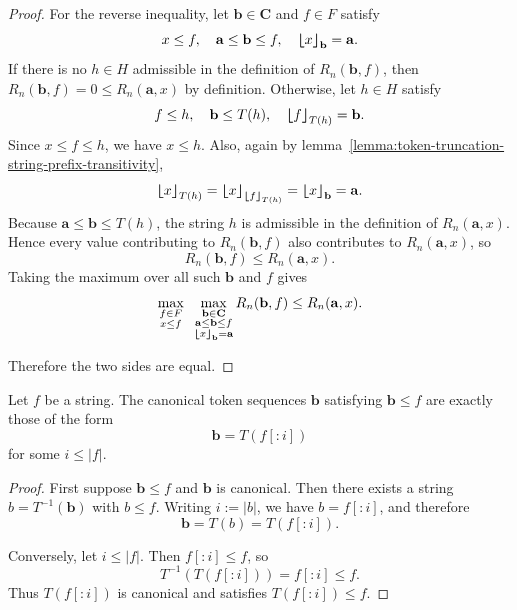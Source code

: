 \begin{proof}
    For the reverse inequality, let $\mathbf{b} \in \mathbf{C}$ and $f \in F$ satisfy
    $$
    x \leq f, \quad \mathbf{a} \leq \mathbf{b} \leq f, \quad {\bm{\lfloor}} x {\bm{\rfloor}}_{\mathbf{b}} = \mathbf{a}.
    $$
    If there is no $h \in H$ admissible in the definition of $R_n(\mathbf{b}, f)$, then
    $R_n(\mathbf{b}, f) = 0 \leq R_n(\mathbf{a}, x)$ by definition.
    Otherwise, let $h \in H$ satisfy
    $$
    f \leq h, \quad \mathbf{b} \leq T(h), \quad {\bm{\lfloor}} f {\bm{\rfloor}}_{T(h)} = \mathbf{b}.
    $$
    Since $x \leq f \leq h$, we have $x \leq h$. Also, again by
    lemma~\ref{lemma:token-truncation-string-prefix-transitivity},
    $$
    {\bm{\lfloor}} x {\bm{\rfloor}}_{T(h)}
    =
    {\bm{\lfloor}} x {\bm{\rfloor}}_{{\bm{\lfloor}} f {\bm{\rfloor}}_{T(h)}}
    =
    {\bm{\lfloor}} x {\bm{\rfloor}}_{\mathbf{b}}
    =
    \mathbf{a}.
    $$
    Because $\mathbf{a} \leq \mathbf{b} \leq T(h)$, the string $h$ is admissible in the
    definition of $R_n(\mathbf{a}, x)$. Hence every value contributing to $R_n(\mathbf{b}, f)$
    also contributes to $R_n(\mathbf{a}, x)$, so
    $$
    R_n(\mathbf{b}, f) \leq R_n(\mathbf{a}, x).
    $$
    Taking the maximum over all such $\mathbf{b}$ and $f$ gives
    $$
    \max_{\substack{
        f \in F \\
        x \leq f
    }}
    \;\;
    \max_{\substack{
        \mathbf{b} \in \mathbf{C} \\
        \mathbf{a} \leq \mathbf{b} \leq f \\
        {\bm{\lfloor}} x {\bm{\rfloor}}_{\mathbf{b}} = \mathbf{a}
    }}
    R_n(\mathbf{b}, f)
    \leq
    R_n(\mathbf{a}, x).
    $$

    Therefore the two sides are equal.
\end{proof}

\begin{lemma}
    \label{lemma:canonical-token-prefixes-of-a-string}
    Let $f$ be a string. The canonical token sequences $\mathbf{b}$ satisfying $\mathbf{b} \leq f$
    are exactly those of the form
    $$
    \mathbf{b} = T(f[:i])
    $$
    for some $i \leq |f|$.
\end{lemma}
\begin{proof}
    First suppose $\mathbf{b} \leq f$ and $\mathbf{b}$ is canonical. Then there exists a string
    $b = T^{-1}(\mathbf{b})$ with $b \leq f$. Writing $i := |b|$, we have $b = f[:i]$, and therefore
    $$
    \mathbf{b}
    =
    T(b)
    =
    T(f[:i]).
    $$

    Conversely, let $i \leq |f|$. Then $f[:i] \leq f$, so
    $$
    T^{-1}(T(f[:i])) = f[:i] \leq f.
    $$
    Thus $T(f[:i])$ is canonical and satisfies $T(f[:i]) \leq f$.
\end{proof}

